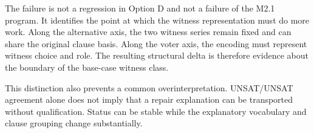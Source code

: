 The \CM{} failure is not a regression in Option D and not a failure of the
M2.1 program.  It identifies the point at which the witness representation must
do more work.  Along the alternative axis, the two witness series remain fixed
and can share the original clause basis.  Along the voter axis, the encoding
must represent witness choice and role.  The resulting structural delta is
therefore evidence about the boundary of the base-case witness class.

This distinction also prevents a common overinterpretation.  UNSAT/UNSAT
agreement alone does not imply that a repair explanation can be transported
without qualification.  Status can be stable while the explanatory vocabulary
and clause grouping change substantially.
